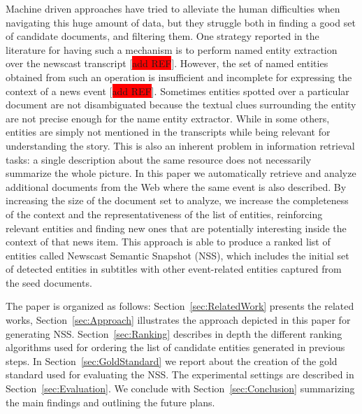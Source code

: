 \documentclass{llncs}
\newcommand{\todo}[1]{\colorbox{red}{#1}}
\begin{document}
Machine driven approaches have tried to alleviate the human difficulties when navigating this huge amount of data, but they struggle both in finding a good set of candidate documents, and filtering them.
One strategy reported in the literature for having such a mechanism is to perform named entity extraction over the newscast transcript [\todo{add REF}]. However, the set of named entities obtained from such an operation is insufficient and incomplete for expressing the context of a news event [\todo{add REF}]. Sometimes entities spotted over a particular document are not disambiguated because the textual clues surrounding the entity are not precise enough for the name entity extractor. While in some others, entities are simply not mentioned in the transcripts while being relevant for understanding the story. This is also an inherent problem in information retrieval tasks: a single description about the same resource does not necessarily summarize the whole picture. In this paper we automatically retrieve and analyze additional documents from the Web where the same event is also described. By increasing the size of the document set to analyze, we increase the completeness of the context and the representativeness of the list of entities, reinforcing relevant entities and finding new ones that are potentially interesting inside the context of that news item. This approach is able to produce a ranked list of entities called Newscast Semantic Snapshot (NSS), which includes the initial set of detected entities in subtitles with other event-related entities captured from the seed documents. 

The paper is organized as follows: Section~\ref{sec:RelatedWork} presents the related works, Section~\ref{sec:Approach} illustrates the approach depicted in this paper for generating NSS. Section~\ref{sec:Ranking} describes in depth the different ranking algorithms used for ordering the list of candidate entities generated in previous steps. In Section~\ref{sec:GoldStandard} we report about the creation of the gold standard used for evaluating the NSS. The experimental settings are described in Section~\ref{sec:Evaluation}. We conclude with Section~\ref{sec:Conclusion} summarizing the main findings and outlining the future plans.
\end{document}

